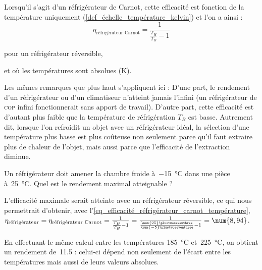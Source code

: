 		Lorsqu’il s’agit d’un réfrigérateur de Carnot, cette efficacité est fonction de la température uniquement (\ref{def_échelle_température_kelvin}) et l’on a ainsi :
		\begin{equation}
			\eta_\text{réfrigérateur Carnot} = \frac{1}{\frac{T_H}{T_B} - 1}
			\label{eq_efficacité_réfrigérateur_carnot_température}
		\end{equation}
		\begin{equationterms}
			\item pour un réfrigérateur réversible,
			\item et où les températures sont absolues (\si{\kelvin}).
		\end{equationterms}

		Les mêmes remarques que plus haut s’appliquent ici : D’une part, le rendement d’un réfrigérateur ou d’un climatiseur n’atteint jamais l’infini (un réfrigérateur de \textsc{cop} infini fonctionnerait sans apport de travail). D’autre part, cette efficacité est d’autant plus faible que la température de réfrigération $T_B$ est basse. Autrement dit, lorsque l’on refroidit un objet avec un réfrigérateur idéal, la sélection d’une température plus basse est plus coûteuse non seulement parce qu’il faut extraire plus de chaleur de l’objet, mais aussi parce que l’efficacité de l’extraction diminue.
		
		 \begin{anexample}
		 \label{ex_efficacite_refrigerateur_carnot}
		 	Un réfrigérateur doit amener la chambre froide à~\SI{-15}{\degreeCelsius} dans une pièce à~\SI{25}{\degreeCelsius}. Quel est le rendement maximal atteignable ?
		 		\begin{answer}
		 			L’efficacité maximale serait atteinte avec un réfrigérateur réversible, ce qui nous permettrait d’obtenir, avec l’\cref{eq_efficacité_réfrigérateur_carnot_température}, $\eta_\text{réfrigérateur} = \eta_\text{réfrigérateur Carnot} = \frac{1}{\frac{T_H}{T_B} - 1} = \frac{1}{\frac{\num{25}\plustwoseventhree}{\num{-5}\plustwoseventhree} - 1} = \num{8,94}$.
		 		\end{answer}
		 			\begin{remark}En effectuant le même calcul entre les températures \SI{185}{\degreeCelsius} et~\SI{225}{\degreeCelsius}, on obtient un rendement de~\num{11,5} : celui-ci dépend non seulement de l’écart entre les températures mais aussi de leurs valeurs absolues.\end{remark}
		 \end{anexample}


